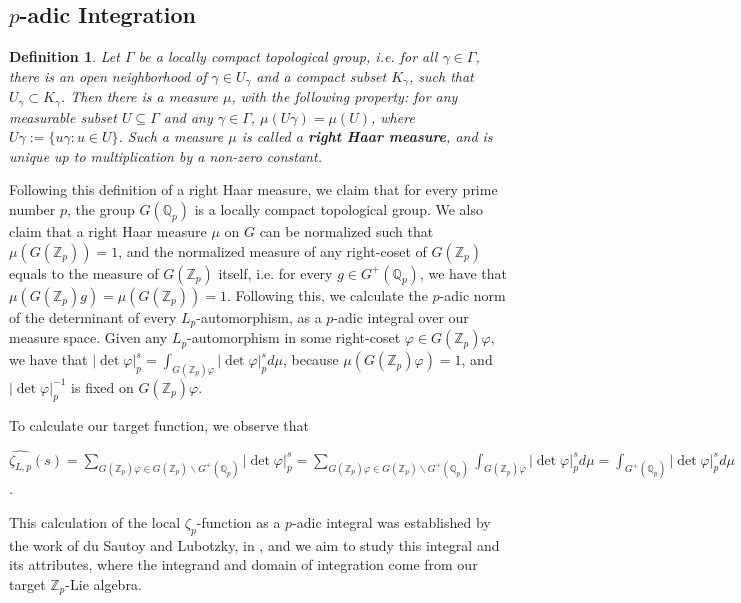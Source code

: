 \documentclass[12pt]{article}
\newtheorem{definition}[theorem]{Definition}
\begin{document}
\subsection{$p$-adic Integration}
\begin{definition}
\label{def.right.haar.measure}
Let $\Gamma$ be a locally compact topological group, i.e. for all $\gamma\in\Gamma$, there is an open neighborhood of $\gamma\in U_{\gamma}$ and a compact subset $K_{\gamma}$, such that $U_{\gamma}\subset K_{\gamma}$. Then there is a measure $\mu$, with the following property: for any measurable subset $U\subseteq\Gamma$ and any $\gamma\in\Gamma$, $\mu(U\gamma)=\mu(U)$, where $U\gamma:=\{u\gamma : u\in U\}$. Such a measure $\mu$ is called a \textbf{right Haar measure}, and is unique up to multiplication by a non-zero constant.
\end{definition}
Following this definition of a right Haar measure, we claim that for every prime number $p$, the group $G(\mathbb{Q}_p)$ is a locally compact topological group. We also claim that a right Haar measure $\mu$ on $G$ can be normalized such that $\mu(G(\mathbb{Z}_p))=1$, and the normalized measure of any right-coset of $G(\mathbb{Z}_p)$ equals to the measure of $G(\mathbb{Z}_p)$ itself, i.e. for every $g\in G^+(\mathbb{Q}_p)$, we have that $\mu(G(\mathbb{Z}_p)g)=\mu(G(\mathbb{Z}_p))=1$.
Following this, we calculate the $p$-adic norm of the determinant of every $L_{p}$-automorphism, as a $p$-adic integral over our measure space.
Given any $L_{p}$-automorphism in some right-coset $\varphi\in G(\mathbb{Z}_p)\varphi$, we have that $|\det\varphi|_p^s=\displaystyle\int_{G(\mathbb{Z}_p)\varphi}|\det\varphi|_p^sd\mu$, because $\mu(G(\mathbb{Z}_p)\varphi)=1$, and $|\det\varphi|_p^{-1}$ is fixed on $G(\mathbb{Z}_p)\varphi$.\par
To calculate our target function, we observe that\par $\hat{\zeta_{L,p}}(s)=\underset{\scriptscriptstyle G(\mathbb{Z}_p)\varphi\in G(\mathbb{Z}_p)\backslash G^+(\mathbb{Q}_p)}{\sum}|\det\varphi|_p^s=\underset{\scriptscriptstyle G(\mathbb{Z}_p)\varphi\in G(\mathbb{Z}_p)\backslash G^+(\mathbb{Q}_p)}{\sum}\displaystyle\int_{G(\mathbb{Z}_p)\varphi}|\det\varphi|_p^sd\mu=\displaystyle\int_{G^+(\mathbb{Q}_p)}|\det\varphi|_p^sd\mu$.\par 
This calculation of the local $\zeta_p$-function as a $p$-adic integral was established by the work of du Sautoy and Lubotzky, in \cite{DuSautoyLubotzky}, and we aim to study this integral and its attributes, where the integrand and domain of integration come from our target $\mathbb{Z}_p$-Lie algebra.
\end{document}
